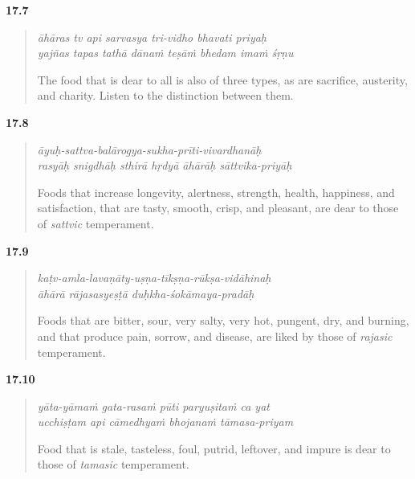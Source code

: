 \par\noindent\textbf{17.7}\par
\begin{verse}
\textit{āhāras tv api sarvasya tri-vidho bhavati priyaḥ} \\
\textit{yajñas tapas tathā dānaṁ teṣāṁ bhedam imaṁ śṛṇu}

\noindent The food that is dear to all is also of three types, as are sacrifice, austerity, and charity. Listen to the distinction between them.
\end{verse}
\par



\par\noindent\textbf{17.8}\par
\begin{verse}
\textit{āyuḥ-sattva-balārogya-sukha-prīti-vivardhanāḥ} \\
\textit{rasyāḥ snigdhāḥ sthirā hṛdyā āhārāḥ sāttvika-priyāḥ}

\noindent Foods that increase longevity, alertness, strength, health, happiness, and satisfaction, that are tasty, smooth, crisp, and pleasant, are dear to those of \textit{sattvic} temperament.
\end{verse}
\par



\par\noindent\textbf{17.9}\par
\begin{verse}
\textit{kaṭv-amla-lavaṇāty-uṣṇa-tīkṣṇa-rūkṣa-vidāhinaḥ} \\
\textit{āhārā rājasasyeṣṭā duḥkha-śokāmaya-pradāḥ}

\noindent Foods that are bitter, sour, very salty, very hot, pungent, dry, and burning, and that produce pain, sorrow, and disease, are liked by those of \textit{rajasic} temperament.
\end{verse}
\par



\par\noindent\textbf{17.10}\par
\begin{verse}
\textit{yāta-yāmaṁ gata-rasaṁ pūti paryuṣitaṁ ca yat} \\
\textit{ucchiṣṭam api cāmedhyaṁ bhojanaṁ tāmasa-priyam}

\noindent Food that is stale, tasteless, foul, putrid, leftover, and impure is dear to those of \textit{tamasic} temperament.
\end{verse}
\par



